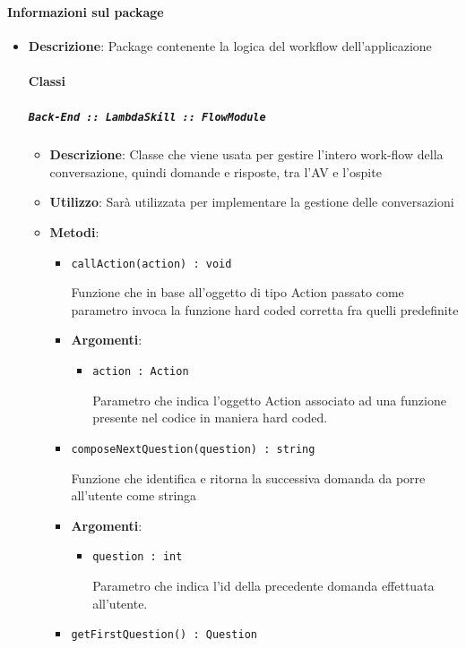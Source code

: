 \documentclass[../DefinizioneDiProdotto.tex]{subfiles}
\begin{document}
	\paragraph{Informazioni sul package}\begin{itemize}\item \textbf{Descrizione}: Package contenente la logica del workflow dell'applicazione
	\paragraph{Classi}
	\subparagraph{\texttt{Back-End :: LambdaSkill :: FlowModule}}
	\begin{itemize}\item \textbf{Descrizione}: Classe che viene usata per gestire l'intero work-flow della conversazione, quindi domande e risposte, tra l'AV e l'ospite
	\item \textbf{Utilizzo}: Sarà utilizzata per implementare la gestione delle conversazioni
	\item \textbf{Metodi}:
	\begin{itemize}
	\item \texttt{callAction(action) : void}\

	 Funzione che in base all'oggetto di tipo Action passato come parametro invoca la funzione hard coded corretta fra quelli predefinite

	\item \textbf{Argomenti}:
	\begin{itemize}
	\item \texttt{action : Action}\

	 Parametro che indica l'oggetto Action associato ad una funzione presente nel codice in maniera hard coded.
	\end{itemize}
	\end{itemize}\vspace{0.5em}
	\begin{itemize}
	\item \texttt{composeNextQuestion(question) : string}\

	 Funzione che identifica e ritorna la successiva domanda da porre all'utente come stringa


	\item \textbf{Argomenti}:
	\begin{itemize}
	\item \texttt{question : int}\

	 Parametro che indica l'id della precedente domanda effettuata all'utente.
	\end{itemize}
	\end{itemize}\vspace{0.5em}
	\begin{itemize}
	\item \texttt{getFirstQuestion() : Question}\


\end{itemize}
\end{itemize}
\end{itemize}
\end{document}

